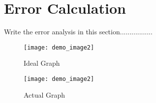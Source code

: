 \section*{Error Calculation }
Write the error analysis in this section.................
\begin{figure}[ht]
   \begin{minipage}{0.48\textwidth}
     \centering
     \texttt{[image: demo\_image2]}
     \caption{Ideal Graph}\label{Fig:Data1}
   \end{minipage}\hfill
   \begin{minipage}{0.48\textwidth}
     \centering
     \texttt{[image: demo\_image2]}
     \caption{Actual Graph}\label{Fig:Data2}
   \end{minipage}
\end{figure}